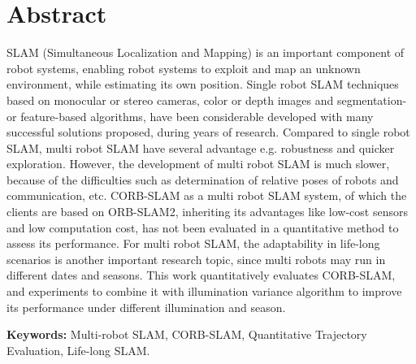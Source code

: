 
\chapter*{Abstract}

SLAM (Simultaneous Localization and Mapping) is an important component of robot systems, enabling robot systems to exploit and map an unknown environment, while estimating its own position. Single robot SLAM techniques based on monocular or stereo cameras, color or depth images and segmentation- or feature-based algorithms, have been considerable developed with many successful solutions proposed, during years of research. Compared to single robot SLAM, multi robot SLAM have several advantage e.g. robustness and quicker exploration. However, the development of multi robot SLAM is much slower, because of the difficulties such as determination of relative poses of robots and communication, etc. CORB-SLAM as a multi robot SLAM system, of which the clients are based on ORB-SLAM2, inheriting its advantages like low-cost sensors and low computation cost, has not been evaluated in a quantitative method to assess its performance. For multi robot SLAM, the adaptability in life-long scenarios is another important research topic, since multi robots may run in different dates and seasons.
This work quantitatively evaluates CORB-SLAM, and experiments to combine it with illumination variance algorithm to improve its performance under different illumination and season.


\par
\textbf{Keywords:} Multi-robot SLAM, CORB-SLAM, Quantitative Trajectory Evaluation, Life-long SLAM.

